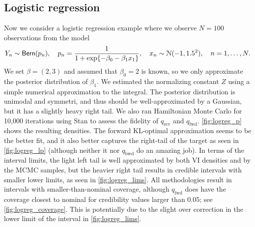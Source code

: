 \subsection{Logistic regression} \label{subsec:logreg}


Now we consider a logistic regression example where
we observe $N=100$ observations from the model
\[
  Y_n\sim{\sf{Bern}}(p_n),\quad
  p_n=\frac{1}{1+\exp\{-\beta_0-\beta_1 x_1\}},\quad
  x_n\sim\mathcal{N}(-1,1.5^2),\quad
  n=1,\dots,N.
\]
We set $\beta=(2,3)$ and assumed that $\beta_0=2$ is known,
so we only approximate the posterior distribution of $\beta_1$.
We estimated the normalizing constant $Z$ using
a simple numerical approximation to the integral.
The posterior distribution is unimodal and symmetri,
and thus should be well-approximated by a Gaussian,
but it has a slightly heavy right tail.
We also ran Hamiltonian Monte Carlo \citep{neal2011hmc}
for 10,000 iterations using Stan \citep{pystan} to assess the fidelity of
$q_\mathrm{rev}$ and $q_\mathrm{fwd}$.
\cref{fig:logreg_p} shows the resulting densities.
The forward KL-optimal approximation seems to be the better fit,
and it also better captures the right-tail of the target
as seen in \cref{fig:logreg_lp}
(although neither it nor $q_\mathrm{bwd}$ do an amazing job).
In terms of the interval limits,
the light left tail is well approximated by both VI densities
and by the MCMC samples,
but the heavier right tail results in
credible intervals with smaller lower limits,
as seen in \cref{fig:logreg_lims}.
All methodologies result in intervals with smaller-than-nominal coverage,
although $q_\mathrm{fwd}$ does have the coverage closest to nominal
for credibility values larger than 0.05; see \cref{fig:logreg_coverage}.
This is potentially due to the slight over correction
in the lower limit of the interval in \cref{fig:logreg_lims}.


